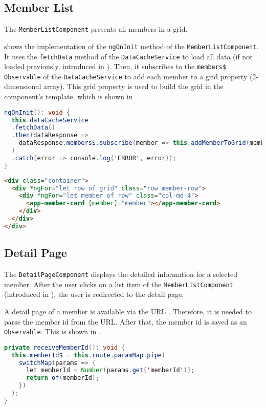\newpage
\subsection{Member List}\label{subsec:02_impl_memberlist}
The \texttt{MemberListComponent} presents all members in a grid.


 shows the implementation of the \texttt{ngOnInit} method of the \newline \texttt{MemberListComponent}. It uses the \texttt{fetchData} method of the \texttt{DataCacheService} to load all data (if not loaded previously, introduced in ). Then, it subscribes to the \texttt{members\$} \texttt{Observable} of the \texttt{DataCacheService} to add each member to a grid property (2-dimensional array).
This grid property is used to build the grid in the component's template, which is shown in .

\begin{lstlisting}[label=lst:02_impl_memberlist_ngoninit, caption=\texttt{MemberListComponent} \texttt{ngOnInit} implementation, language=java]
ngOnInit(): void {
  this.dataCacheService
  .fetchData()
  .then(dataResponse =>
    dataResponse.members$.subscribe(member => this.addMemberToGrid(member))
  )
  .catch(error => console.log('ERROR', error));
}
\end{lstlisting}


\begin{lstlisting}[label=lst:02_impl_memberlist_template, caption=Template of \texttt{MemberListComponent}, language=HTML]
<div class="container">
  <div *ngFor="let row of grid" class="row member-row">
    <div *ngFor="let member of row" class="col-md-4">
      <app-member-card [member]="member"></app-member-card>
    </div>
  </div>
</div>
\end{lstlisting}


\newpage
\subsection{Detail Page}\label{subsec:02_impl_detail}
The \texttt{DetailPageComponent} displays the detailed information for a selected member.
After the user clicks on a list item of the \texttt{MemberListComponent} (introduced in ), the user is redirected to the detail page.


A detail page of a member is available via the URL . Therefore, it is needed to parse the member id from the URL. After that, the member id is saved as an \texttt{Observable}. This is shown in .
\begin{lstlisting}[label=lst:02_impl_detail_receiveMemberId, caption=Implementation of \texttt{receiveMemberId}, language=java]
private receiveMemberId(): void {
  this.memberId$ = this.route.paramMap.pipe(
    switchMap(params => {
      let memberId = Number(params.get('memberId'));
      return of(memberId);
    })
  );
}
\end{lstlisting}

